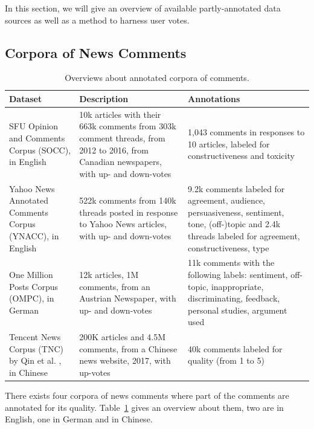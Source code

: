 
In this section, we will give an overview of available partly-annotated data sources as well as a method to harness user votes.

\subsection{Corpora of News Comments}
\label{sec:commcorp}
\begin{center}
\begin{table}
  \begin{tabular}{| p{2cm} | p{2.8cm} | p{2.7cm} |}
    \hline
    Dataset & Description & Annotations \\ \hline
    SFU Opinion and Comments Corpus \cite{kolhatkar2018sfu} (SOCC), in English & 10k articles with their 663k comments from 303k comment threads, from 2012 to 2016, from Canadian newspapers, with up- and down-votes & 1,043 comments in responses to 10 articles, labeled for constructiveness and toxicity \\ \hline
    Yahoo News Annotated Comments Corpus \cite{napoles2017finding} (YNACC), in English & 522k comments from 140k threads posted in response to Yahoo News articles, with up- and down-votes & 9.2k comments labeled for agreement, audience, persuasiveness, sentiment, tone, (off-)topic and 2.4k threads labeled for agreement, constructiveness, type \\ \hline
        One Million Posts Corpus \cite{Schabus:2017:OMP:3077136.3080711, schabus_academic-industrial_nodate} (OMPC), in German & 12k articles, 1M comments, from an Austrian Newspaper, with up- and down-votes & 11k comments with the following labels: sentiment, off-topic, inappropriate, discriminating, feedback, personal studies, argument used \\ \hline
        Tencent News Corpus (TNC) by Qin et al. \cite{2018arXiv180503668Q}, in Chinese &  200K articles and 4.5M comments, from a Chinese news website, 2017, with up-votes & 40k comments labeled for quality (from 1 to 5) \\ \hline
  \end{tabular}
  \caption{Overviews about annotated corpora of comments.}
  \label{table:datasets}
  \end{table}
\end{center}
There exists four corpora of news comments where part of the comments are annotated for its quality. Table~\ref{table:datasets} gives an overview about them, two are in English, one in German and in Chinese.


